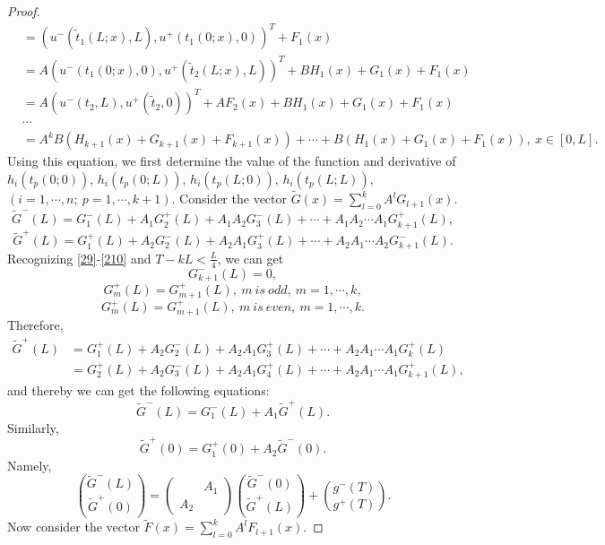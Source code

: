 \documentclass[a4paper,reqno,11pt]{amsart}
\numberwithin{equation}{section} %
\begin{document}
\begin{proof}
\begin{equation}
\begin{aligned}
							   &=(u^- (\tilde{t} _1(L;x) ,L) ,u^+ (t _1(0;x),0))^T + F_1(x)\\
							   &=A(u^- (t _1(0;x) ,0) ,u^+ (\tilde{t} _2 (L;x),L))^T + BH _1(x)+G_1(x)+F_1(x)\\
							   &=A(u^- (t _2 ,L) ,u^+ (\tilde{t} _2 ,0))^T +AF_2(x)+ BH _1(x)+G_1(x)+F_1(x)\\
							   & \cdots \\
							   &=A^kB(H_{k+1}\left( x \right)+G_{k+1}\left( x \right)+F_{k+1}\left( x \right)) +\cdots  +B(H_1\left( x \right)+G_1\left( x \right)+F_1\left( x \right)) ,\ x\in \left[ 0,L \right].
	\end{aligned}
	\end{equation}
Using this equation, we first determine the value of the function and derivative of $h_i(t_p(0;0))$, $h_i(t_p(0;L))$, $h_i(t_p(L;0))$, $h_i(t_p(L;L))$, $(i=1,\cdots,n;\ p=1,\cdots,k+1)$.
Consider the vector $\tilde{G}  (x) = \sum_{l=0}^k A^l G _{l+1}(x)$.
$$
\tilde{G}^-  (L) =G^- _1 (L) +A_1 G^+ _2 (L) +A_1 A_2 G^- _3 (L)  +\cdots +A_1 A_2 \cdots A_1 G^+ _{k+1} (L) ,
$$
$$
\tilde{G}^+  (L) =G^+ _1 (L) +A_2 G^- _2 (L) +A_2 A_1 G^+ _3 (L)  +\cdots +A_2 A_1 \cdots A_2 G^- _{k+1} (L) .
$$
Recognizing \eqref{29}-\eqref{210} and $T-kL < \frac{L}{4}$, we can get 
$$
G^- _{k+1}(L)=0,
$$
$$
G^+ _{m}(L) =G^+ _{m+1}(L) ,\ m\ is\ odd ,\ m=1,\cdots ,k,
$$
$$
G^+ _{m}(L) =G^+ _{m+1}(L) ,\ m\ is\ even ,\ m=1,\cdots ,k.
$$
Therefore,
\begin{equation}
	\begin{aligned}
		\tilde{G}^+  (L) &=G^+ _1 (L) +A_2 G^- _2 (L) +A_2 A_1 G^+ _3 (L)  +\cdots +A_2 A_1 \cdots A_1 G^+ _{k} (L) \\
		                 &=G^+ _2 (L) +A_2 G^- _3 (L) +A_2 A_1 G^+ _4 (L)  +\cdots +A_2 A_1 \cdots A_1 G^+ _{k+1} (L) ,
	\end{aligned}
\end{equation}
and thereby we can get the following equations:
$$
\tilde{G}^-  (L) =G^- _1 (L) +A_1 \tilde{G} ^+  (L) .
$$
Similarly,
$$
\tilde{G}^+  (0) =G^+ _1 (0) +A_2 \tilde{G} ^-  (0) .
$$
Namely, 
\begin{equation}\label{20}
    \binom{\tilde{G} ^{-}(L)}{\tilde{G}^{+}(0)}=\left(\begin{array}{ll} 
        & A_1 \\
        A_2 &
    \end{array}\right)\binom{\tilde{G}^{-}(0)}{\tilde{G} ^{+}(L)}+ \binom{g ^{-}(T)}{g ^{+}(T)}.
\end{equation}
Now consider the vector $\tilde{F}  (x) = \sum_{l=0}^k A^l F _{l+1}(x)$.

\end{proof}
\end{document}

